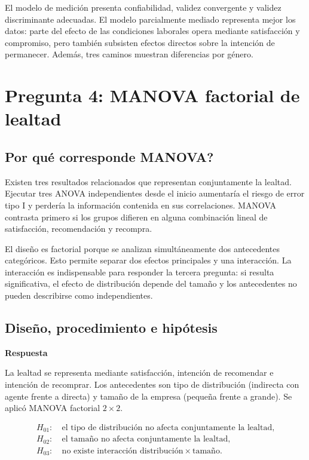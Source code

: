 \documentclass[11pt,letterpaper]{article}
\begin{document}
El modelo de medición presenta confiabilidad, validez convergente y validez discriminante adecuadas. El modelo parcialmente mediado representa mejor los datos: parte del efecto de las condiciones laborales opera mediante satisfacción y compromiso, pero también subsisten efectos directos sobre la intención de permanecer. Además, tres caminos muestran diferencias por género.

\section{Pregunta 4: MANOVA factorial de lealtad}

\subsection{\texorpdfstring{\textquestiondown Por qué corresponde MANOVA?}{Por qué corresponde MANOVA?}}

Existen tres resultados relacionados que representan conjuntamente la lealtad. Ejecutar tres ANOVA independientes desde el inicio aumentaría el riesgo de error tipo I y perdería la información contenida en sus correlaciones. MANOVA contrasta primero si los grupos difieren en alguna combinación lineal de satisfacción, recomendación y recompra.

El diseño es factorial porque se analizan simultáneamente dos antecedentes categóricos. Esto permite separar dos efectos principales y una interacción. La interacción es indispensable para responder la tercera pregunta: si resulta significativa, el efecto de distribución depende del tamaño y los antecedentes no pueden describirse como independientes.

\subsection{Diseño, procedimiento e hipótesis}

\textbf{Respuesta}

La lealtad se representa mediante satisfacción, intención de recomendar e intención de recomprar. Los antecedentes son tipo de distribución (indirecta con agente frente a directa) y tamaño de la empresa (pequeña frente a grande). Se aplicó MANOVA factorial $2\times2$.

\begin{align*}
H_{01}:&\ \text{el tipo de distribución no afecta conjuntamente la lealtad},\\
H_{02}:&\ \text{el tamaño no afecta conjuntamente la lealtad},\\
H_{03}:&\ \text{no existe interacción distribución}\times\text{tamaño}.
\end{align*}
\end{document}
